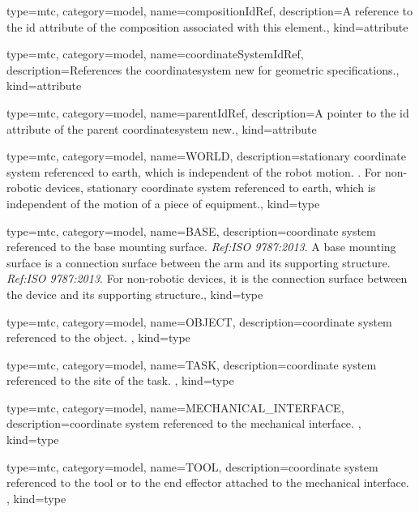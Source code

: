 {
  type=mtc,
  category=model,
  name={compositionIdRef},
  description={A reference to the \gls{id} attribute of the \gls{composition} associated with this element.},
  kind={attribute}
}


{
  type=mtc,
  category=model,
  name={coordinateSystemIdRef},
  description={References the \gls{coordinatesystem new} for geometric \gls{specifications}.},
  kind={attribute}
}


{
  type=mtc,
  category=model,
  name={parentIdRef},
  description={A pointer to the \gls{id} attribute of the parent \gls{coordinatesystem new}.},
  kind={attribute}
}


{
  type=mtc,
  category=model,
  name={WORLD},
  description={stationary coordinate system referenced to earth, which is independent of the robot motion. .
  \newline For non-robotic devices, stationary coordinate system referenced to earth, which is independent of the motion of a piece of equipment.},
  kind={type}
}


{
  type=mtc,
  category=model,
  name={BASE},
  description={coordinate system referenced to the base mounting surface. \textit{Ref:ISO 9787:2013}.
  \newline A base mounting surface is a connection surface between the arm and its supporting structure. \textit{Ref:ISO 9787:2013}.
  \newline For non-robotic devices, it is the connection surface between the device and its supporting structure.},
  kind={type}
}


{
  type=mtc,
  category=model,
  name={OBJECT},
  description={coordinate system referenced to the object. },
  kind={type}
}


{
  type=mtc,
  category=model,
  name={TASK},
  description={coordinate system referenced to the site of the task. },
  kind={type}
}


{
  type=mtc,
  category=model,
  name={MECHANICAL\_INTERFACE},
  description={coordinate system referenced to the mechanical interface. },
  kind={type}
}


{
  type=mtc,
  category=model,
  name={TOOL},
  description={coordinate system referenced to the tool or to the end effector attached to the mechanical interface. },
  kind={type}
}


